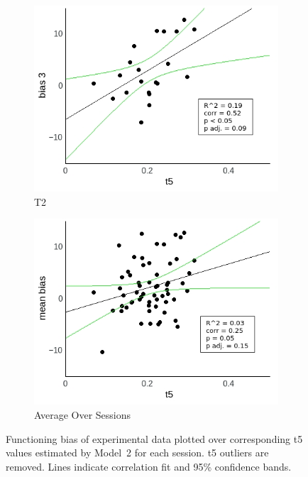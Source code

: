 \documentclass[a4paper]{scrreprt}
\begin{document}
\begin{figure}
\begin{subfigure}[b]{0.49\textwidth}
        \includegraphics[width=\textwidth]{figs/sec3/t5/t5no_diff_3_mod2dat.jpeg}
        \caption{T2}
    \end{subfigure}
    \begin{subfigure}[b]{0.49\textwidth}
        \includegraphics[width=\textwidth]{figs/sec3/t5/t5no_diff_mean_mod2dat.jpeg}
        \caption{Average Over Sessions}
    \end{subfigure}
\caption{Functioning bias of experimental data plotted over corresponding t5 values estimated by Model~2 for each session. t5 outliers are removed. Lines indicate correlation fit and 95\% confidence bands.}
\label{fig:t5no_diff_mod2dat}
\end{figure}
\end{document}
